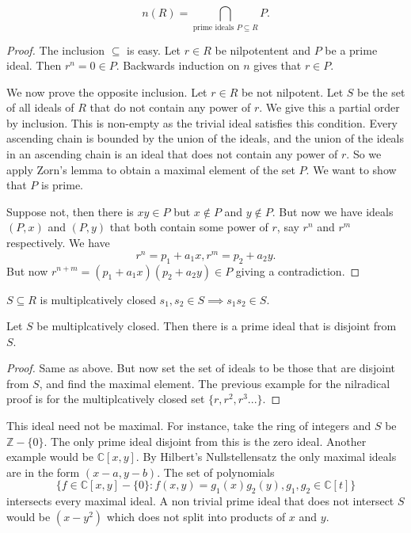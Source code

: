 \section{}
\begin{atheorem}{}{}
    \[n(R)=\bigcap_{\textrm{prime ideals }P\subseteq R}P.\]
\end{atheorem}
\begin{proof}
    The inclusion $\subseteq$ is easy. Let $r\in R$ be nilpotentent and $P$ be a prime ideal. Then $r^n=0\in P$. Backwards induction on $n$ gives that $r\in P$.

    We now prove the opposite inclusion. 
    Let $r\in R$ be not nilpotent. Let $S$ be the set of all ideals of $R$ that do not contain any power of $r$. We give this a partial order by inclusion. This is non-empty as the trivial ideal satisfies this condition. Every ascending chain is bounded by the union of the ideals, and the union of the ideals in an ascending chain is an ideal that does not contain any power of $r$. So we apply Zorn's lemma to obtain a maximal element of the set $P$. We want to show that $P$ is prime. 

    Suppose not, then there is $xy\in P$ but $x\notin P$ and $y\notin P$.
    But now we have ideals
    $(P,x)$ and $(P,y)$ that both contain some power of $r$, say $r^n$ and $r^m$ respectively. We have \[
    r^n=p_1+a_1x, r^m=p_2+a_2y.
    \]
    But now $r^{n+m}=(p_1+a_1x)(p_2+a_2y)\in P$ giving a contradiction.
\end{proof}
\begin{adefinition}{}{}
    $S\subseteq R$ is multiplcatively closed $s_1,s_2\in S\implies s_1s_2\in S$.
\end{adefinition}
\begin{atheorem}{}{}
    Let $S$ be multiplcatively closed. Then there is a prime ideal that is disjoint from $S$.
\end{atheorem}
\begin{proof}
    Same as above. But now set the set of ideals to be those that are disjoint from $S$, and find the maximal element. The previous example for the nilradical proof is for the multiplcatively closed set $\{r, r^2, r^3...\}$.
\end{proof}
\begin{remark}
    This ideal need not be maximal. For instance, take the ring of integers and $S$ be $\mathbb{Z}-\{0\}$. The only prime ideal disjoint from this is the zero ideal. Another example would be $\mathbb{C}[x,y]$. By Hilbert's Nullstellensatz the only maximal ideals are in the form $(x-a, y-b)$. The set of polynomials\[
    \{f\in \mathbb{C}[x,y]-\{0\}: f(x,y)=g_1(x)g_2(y),g_1,g_2\in \mathbb{C}[t]\}
    \]intersects every maximal ideal. 
    A non trivial prime ideal that does not intersect $S$ would be $(x-y^2)$ which does not split into products of $x$ and $y$.
\end{remark}


